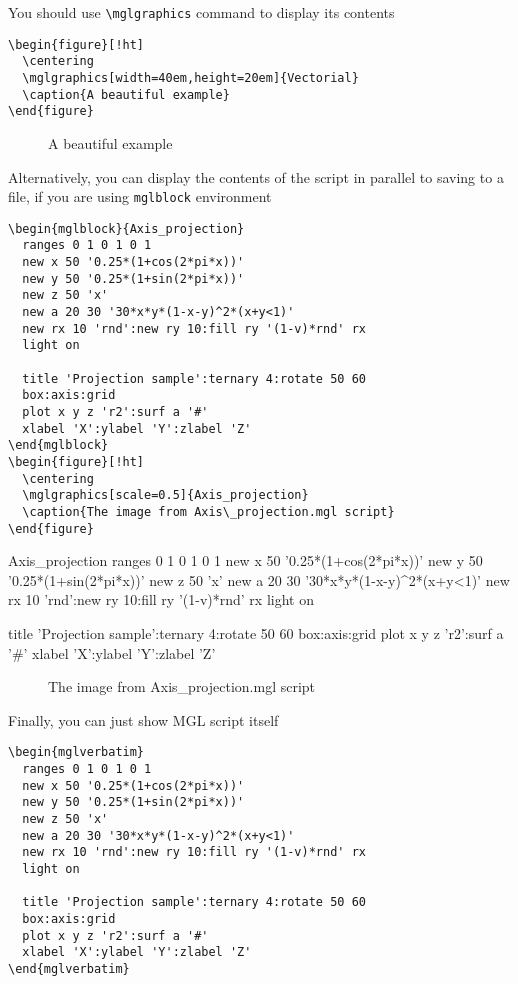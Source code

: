 \documentclass{article}
\begin{document}
You should use \texttt{\textbackslash{}mglgraphics} command to display its contents
\begin{verbatim}
\begin{figure}[!ht]
  \centering
  \mglgraphics[width=40em,height=20em]{Vectorial}
  \caption{A beautiful example}
\end{figure}
\end{verbatim}

\begin{figure}[!ht]
  \centering
  \caption{A beautiful example}
\end{figure}

Alternatively, you can display the contents of the script in parallel to saving to a file, if you are using \texttt{mglblock} environment
\begin{verbatim}
\begin{mglblock}{Axis_projection}
  ranges 0 1 0 1 0 1
  new x 50 '0.25*(1+cos(2*pi*x))'
  new y 50 '0.25*(1+sin(2*pi*x))'
  new z 50 'x'
  new a 20 30 '30*x*y*(1-x-y)^2*(x+y<1)'
  new rx 10 'rnd':new ry 10:fill ry '(1-v)*rnd' rx
  light on
  
  title 'Projection sample':ternary 4:rotate 50 60
  box:axis:grid
  plot x y z 'r2':surf a '#'
  xlabel 'X':ylabel 'Y':zlabel 'Z'
\end{mglblock}
\begin{figure}[!ht]
  \centering
  \mglgraphics[scale=0.5]{Axis_projection}
  \caption{The image from Axis\_projection.mgl script}
\end{figure}
\end{verbatim}

\begin{mglblock}{Axis_projection}
  ranges 0 1 0 1 0 1
  new x 50 '0.25*(1+cos(2*pi*x))'
  new y 50 '0.25*(1+sin(2*pi*x))'
  new z 50 'x'
  new a 20 30 '30*x*y*(1-x-y)^2*(x+y<1)'
  new rx 10 'rnd':new ry 10:fill ry '(1-v)*rnd' rx
  light on
  
  title 'Projection sample':ternary 4:rotate 50 60
  box:axis:grid
  plot x y z 'r2':surf a '#'
  xlabel 'X':ylabel 'Y':zlabel 'Z'
\end{mglblock}
\begin{figure}[!ht]
  \centering
  \caption{The image from Axis\_projection.mgl script}
\end{figure}

Finally, you can just show MGL script itself
\begin{verbatim}
\begin{mglverbatim}
  ranges 0 1 0 1 0 1
  new x 50 '0.25*(1+cos(2*pi*x))'
  new y 50 '0.25*(1+sin(2*pi*x))'
  new z 50 'x'
  new a 20 30 '30*x*y*(1-x-y)^2*(x+y<1)'
  new rx 10 'rnd':new ry 10:fill ry '(1-v)*rnd' rx
  light on
  
  title 'Projection sample':ternary 4:rotate 50 60
  box:axis:grid
  plot x y z 'r2':surf a '#'
  xlabel 'X':ylabel 'Y':zlabel 'Z'
\end{mglverbatim}
\end{verbatim}
\end{document}
